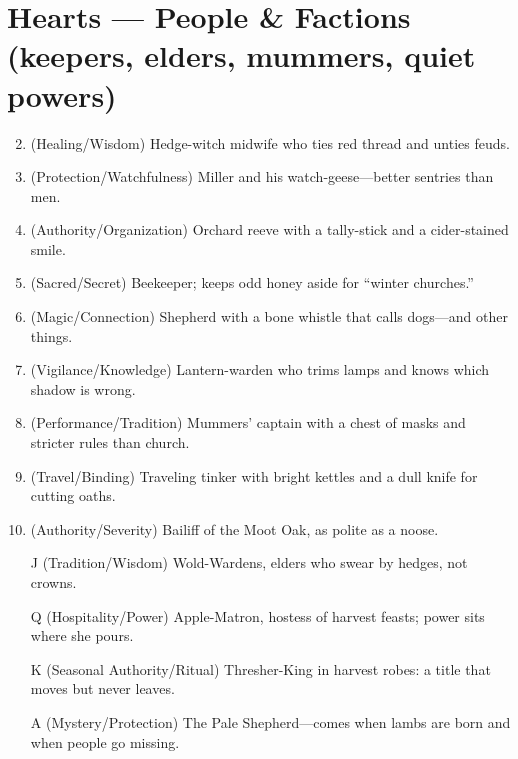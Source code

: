 \section*{Hearts --- People \& Factions (keepers, elders, mummers, quiet powers)}
\label{sec:aelaerem-people}
\begin{enumerate}
\setcounter{enumi}{1}
\item (Healing/Wisdom) Hedge-witch midwife who ties red thread and unties feuds.
\item (Protection/Watchfulness) Miller and his watch-geese---better sentries than men.
\item (Authority/Organization) Orchard reeve with a tally-stick and a cider-stained smile.
\item (Sacred/Secret) Beekeeper; keeps odd honey aside for ``winter churches.''
\item (Magic/Connection) Shepherd with a bone whistle that calls dogs---and other things.
\item (Vigilance/Knowledge) Lantern-warden who trims lamps and knows which shadow is wrong.
\item (Performance/Tradition) Mummers' captain with a chest of masks and stricter rules than church.
\item (Travel/Binding) Traveling tinker with bright kettles and a dull knife for cutting oaths.
\item (Authority/Severity) Bailiff of the Moot Oak, as polite as a noose.
\item[J] (Tradition/Wisdom) Wold-Wardens, elders who swear by hedges, not crowns.
\item[Q] (Hospitality/Power) Apple-Matron, hostess of harvest feasts; power sits where she pours.
\item[K] (Seasonal Authority/Ritual) Thresher-King in harvest robes: a title that moves but never leaves.
\item[A] (Mystery/Protection) The Pale Shepherd---comes when lambs are born and when people go missing.
\end{enumerate}

